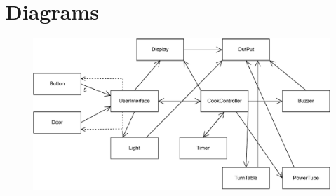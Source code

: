 \section{Diagrams}

\begin{figure}

\includegraphics[scale=1]{02-Body/Image/ClassDiagram}

\end{figure}

\newpage

